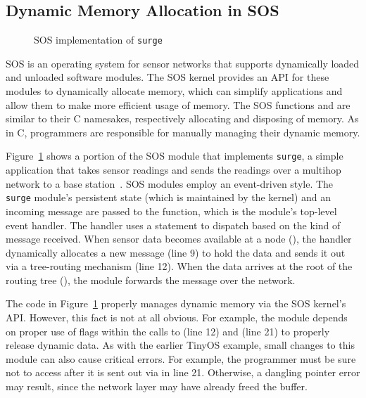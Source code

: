 \subsection{Dynamic Memory Allocation in SOS}

\begin{figure}[t]

\caption{SOS implementation of {\tt surge}\label{fig:surge}}
\end{figure}

SOS is an operating system for sensor networks that 
supports dynamically loaded and unloaded software modules.
The SOS kernel provides an API for these modules to dynamically
allocate memory, which can simplify applications and allow them to
make more efficient usage of memory.
The SOS functions  and  are similar
to their C namesakes, respectively
allocating and disposing of memory.  
As in C, programmers are responsible for manually managing their
dynamic memory.  

Figure~\ref{fig:surge} shows a portion of the SOS module that
implements {\tt surge}, a simple application that takes
sensor readings and sends the readings over a multihop network to a
base station~\cite{nesC}.  SOS modules employ an event-driven style.  
The {\tt surge} module's persistent state (which is maintained by the
kernel) and an
incoming message are passed to the  function,
which is the module's top-level event handler.  The handler
uses a  statement to dispatch based on the kind of
message received.  
When sensor data becomes available at a node
(), the handler dynamically 
allocates a new message (line
9) to hold the data and sends it out via a tree-routing mechanism
(line 12).  %
When the data arrives at the root of the
routing tree
(), the module %
forwards the
message over the network.

The code in Figure~\ref{fig:surge} properly manages dynamic memory via the
SOS kernel's API.  However, this fact is
not at all obvious.  For example, the module depends on
proper use of flags within the calls to  (line 12) and 
 (line 21)
to properly release dynamic data.
As with the earlier TinyOS example, small
changes to this module can also cause critical errors.  For example,
the programmer must be sure not to access  after it is sent
out via
 in line 21.  Otherwise, a dangling pointer error may
result, since the network layer may have already freed the buffer. 

